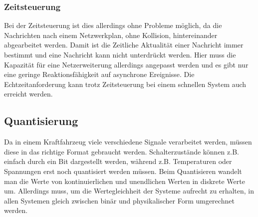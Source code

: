     \subsubsection{Zeitsteuerung}
    Bei der Zeitsteuerung ist dies allerdings ohne Probleme möglich, da die Nachrichten nach einem Netzwerkplan, ohne Kollision, hintereinander abgearbeitet werden.
    Damit ist die Zeitliche Aktualität einer Nachricht immer bestimmt und eine Nachricht kann nicht unterdrückt werden.
    Hier muss die Kapazität für eine Netzerweiterung allerdings angepasst werden und es gibt nur eine geringe Reaktionsfähigkeit auf asynchrone Ereignisse.
    Die Echtzeitanforderung kann trotz Zeitsteuerung bei einem schnellen System auch erreicht werden. 

    \subsection{Quantisierung}
    Da in einem Kraftfahrzeug viele verschiedene Signale verarbeitet werden, müssen diese in das richtige Format gebraucht werden.
    Schalterzustände können \ac{z.B.} einfach durch ein Bit dargestellt werden, während \ac{z.B.} Temperaturen oder Spannungen erst noch quantisiert werden müssen.
    Beim Quantisieren wandelt man die Werte von kontinuierlichen und unendlichen Werten in diskrete Werte um.
    Allerdings muss, um die Wertegleichheit der Systeme aufrecht zu erhalten, in allen Systemen gleich zwischen binär und physikalischer Form umgerechnet werden. 

    